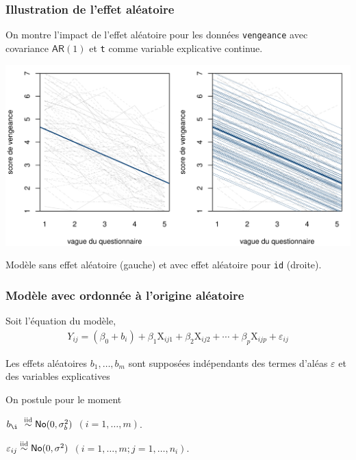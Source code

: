 \documentclass{beamer}
\begin{document}
\begin{frame}[fragile]
\frametitle{Illustration de l'effet aléatoire}
On montre l'impact de l'effet aléatoire pour les données \texttt{vengeance} avec covariance $\mathsf{AR}(1)$ et \texttt{t} comme variable explicative continue.

\begin{center}
\includegraphics[width = 0.8\linewidth]{img/c6/07-mixed-randomintercept_fr}
\end{center}
{
\footnotesize Modèle sans effet aléatoire (gauche) et avec effet aléatoire pour \texttt{id} (droite).

}
\end{frame}
\begin{frame}[fragile]
\frametitle{Modèle avec ordonnée à l'origine aléatoire}
Soit l'équation du modèle,
\begin{align*}
Y_{ij}=(\beta_0+b_i)+ \beta_1 \mathrm{X}_{ij1}+\beta_2\mathrm{X}_{ij2}+\cdots+\beta_p\mathrm{X}_{ijp} + \varepsilon_{ij}
\end{align*}
\bi
\item Les effets aléatoires $b_1, \ldots, b_m$ sont supposées indépendants des termes d'aléas $\varepsilon$ et des variables explicatives
\item On postule  pour le moment 
\bi \item $b_{\i\phantom{j}}\simiid \mathsf{No}(0, \sigma^2_b)$ $(i=1, \ldots, m)$.
\item $\varepsilon_{ij}\stackrel{\textnormal{iid}}{\sim} \mathsf{No}(0, \sigma^2)$ $(i=1, \ldots, m; j = 1, \ldots, n_i)$.
\ei
\ei
\end{frame}
\end{document}
